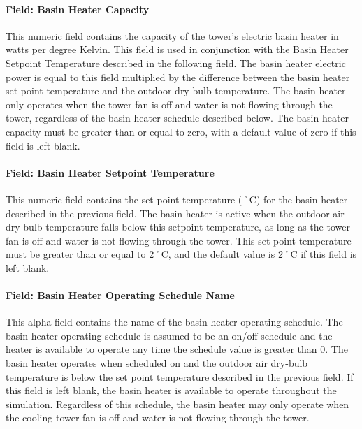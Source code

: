 \paragraph{Field: Basin Heater Capacity}\label{field-basin-heater-capacity}

This numeric field contains the capacity of the tower's electric basin heater in watts per degree Kelvin. This field is used in conjunction with the Basin Heater Setpoint Temperature described in the following field. The basin heater electric power is equal to this field multiplied by the difference between the basin heater set point temperature and the outdoor dry-bulb temperature. The basin heater only operates when the tower fan is off and water is not flowing through the tower, regardless of the basin heater schedule described below. The basin heater capacity must be greater than or equal to zero, with a default value of zero if this field is left blank.

\paragraph{Field: Basin Heater Setpoint Temperature}\label{field-basin-heater-setpoint-temperature}

This numeric field contains the set point temperature (˚C) for the basin heater described in the previous field. The basin heater is active when the outdoor air dry-bulb temperature falls below this setpoint temperature, as long as the tower fan is off and water is not flowing through the tower. This set point temperature must be greater than or equal to 2˚C, and the default value is 2˚C if this field is left blank.

\paragraph{Field: Basin Heater Operating Schedule Name}\label{field-basin-heater-operating-schedule-name}

This alpha field contains the name of the basin heater operating schedule. The basin heater operating schedule is assumed to be an on/off schedule and the heater is available to operate any time the schedule value is greater than 0. The basin heater operates when scheduled on and the outdoor air dry-bulb temperature is below the set point temperature described in the previous field. If this field is left blank, the basin heater is available to operate throughout the simulation. Regardless of this schedule, the basin heater may only operate when the cooling tower fan is off and water is not flowing through the tower.

